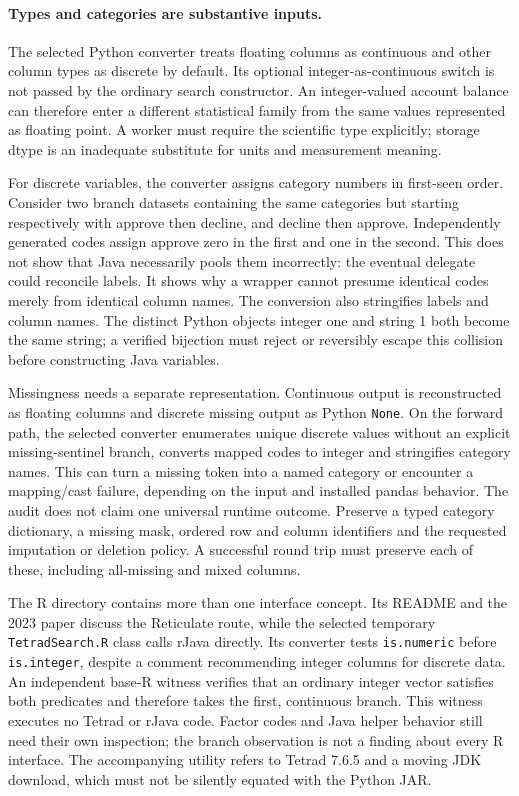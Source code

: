 \paragraph{Types and categories are substantive inputs.}
The selected Python converter treats floating columns as continuous and other
column types as discrete by default. Its optional integer-as-continuous switch
is not passed by the ordinary search constructor. An integer-valued account
balance can therefore enter a different statistical family from the same
values represented as floating point. A worker must require the scientific
type explicitly; storage dtype is an inadequate substitute for units and
measurement meaning.~\citep{exec24_pytetrad_source}

For discrete variables, the converter assigns category numbers in first-seen
order. Consider two branch datasets containing the same categories but starting
respectively with approve then decline, and decline then approve. Independently
generated codes assign approve zero in the first and one in the second. This
does not show that Java necessarily pools them incorrectly: the eventual
delegate could reconcile labels. It shows why a wrapper cannot presume identical
codes merely from identical column names. The conversion also stringifies labels
and column names. The distinct Python objects integer one and string 1
both become the same string; a verified bijection must reject or reversibly
escape this collision before constructing Java variables.
\citep{exec24_pytetrad_source,exec24_pytetrad_choice}

Missingness needs a separate representation. Continuous output is reconstructed
as floating columns and discrete missing output as Python \texttt{None}. On
the forward path, the selected converter enumerates unique discrete values
without an explicit missing-sentinel branch, converts mapped codes to integer
and stringifies category names. This can turn a missing token into a named
category or encounter a mapping/cast failure, depending on the input and
installed pandas behavior. The audit does not claim one universal runtime
outcome. Preserve a typed category dictionary, a missing mask, ordered row and
column identifiers and the requested imputation or deletion policy. A successful
round trip must preserve each of these, including all-missing and mixed columns.
\citep{exec24_pytetrad_source}

The R directory contains more than one interface concept. Its README and the
2023 paper discuss the Reticulate route, while the selected temporary
\texttt{TetradSearch.R} class calls rJava directly. Its converter tests
\texttt{is.numeric} before \texttt{is.integer}, despite a comment recommending
integer columns for discrete data. An independent base-R witness verifies that
an ordinary integer vector satisfies both predicates and therefore takes the
first, continuous branch. This witness executes no Tetrad or rJava code.
Factor codes and Java helper behavior still need their own inspection; the
branch observation is not a finding about every R interface. The accompanying
utility refers to Tetrad 7.6.5 and a moving JDK download, which must not be
silently equated with the Python JAR.~\citep{exec24_pytetrad_source,exec24_pytetrad_choice}

